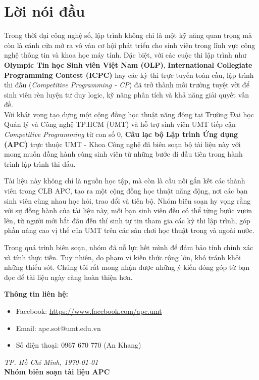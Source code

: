 \chapter*{Lời nói đầu}

Trong thời đại công nghệ số, lập trình không chỉ là một kỹ năng quan trọng mà còn là cánh cửa mở ra vô vàn cơ hội phát triển cho sinh viên trong lĩnh vực công nghệ thông tin và khoa học máy tính.  
Đặc biệt, với các cuộc thi lập trình như \textbf{Olympic Tin học Sinh viên Việt Nam (OLP)}, \textbf{International Collegiate Programming Contest (ICPC)} hay các kỳ thi trực tuyến toàn cầu, lập trình thi đấu (\textit{Competitive Programming - CP}) đã trở thành môi trường tuyệt vời để sinh viên rèn luyện tư duy logic, kỹ năng phân tích và khả năng giải quyết vấn đề.  \\

Với khát vọng tạo dựng một cộng đồng học thuật năng động tại Trường Đại học Quản lý và Công nghệ TP.HCM (UMT) và hỗ trợ sinh viên UMT tiếp cận \textit{Competitive Programming} từ con số 0, \textbf{Câu lạc bộ Lập trình Ứng dụng (APC)} trực thuộc UMT - Khoa Công nghệ đã biên soạn bộ tài liệu này với mong muốn đồng hành cùng sinh viên từ những bước đi đầu tiên trong hành trình lập trình thi đấu.

\vspace{0.5cm}

Tài liệu này không chỉ là nguồn học tập, mà còn là cầu nối gắn kết các thành viên trong CLB APC, tạo ra một cộng đồng học thuật năng động, nơi các bạn sinh viên cùng nhau học hỏi, trao đổi và tiến bộ.  
Nhóm biên soạn hy vọng rằng với sự đồng hành của tài liệu này, mỗi bạn sinh viên đều có thể từng bước vươn lên, từ người mới bắt đầu đến thí sinh tự tin tham gia các kỳ thi lập trình, góp phần nâng cao vị thế của UMT trên các sân chơi học thuật trong và ngoài nước.

\vspace{0.5cm}
\noindent
Trong quá trình biên soạn, nhóm đã nỗ lực hết mình để đảm bảo tính chính xác và tính thực tiễn. Tuy nhiên, do phạm vi kiến thức rộng lớn, khó tránh khỏi những thiếu sót. Chúng tôi rất mong nhận được những ý kiến đóng góp từ bạn đọc để tài liệu ngày càng hoàn thiện hơn.

\vspace{0.5cm}

\textbf{Thông tin liên hệ:}
\begin{itemize}
    \item Facebook: \url{https://www.facebook.com/apc.umt}
    \item Email: apc.sot@umt.edu.vn
    \item Số điện thoại: 0967 670 770 (An Khang)
\end{itemize}

\vspace{1cm}
\begin{flushright}
\textit{TP. Hồ Chí Minh, \today} \\[0.3cm]
\textbf{Nhóm biên soạn tài liệu APC}
\end{flushright}
